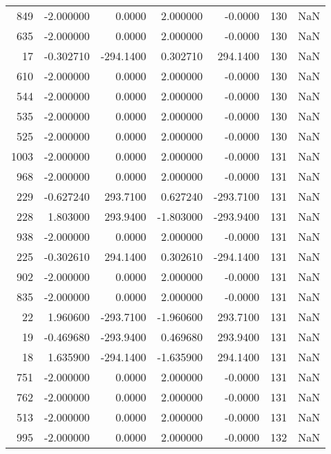\begin{tabular}{rrrrrrr}
 849 &   -2.000000 &    0.0000 &    2.000000 &     -0.0000 &         130 & NaN \\
 635 &   -2.000000 &    0.0000 &    2.000000 &     -0.0000 &         130 & NaN \\
  17 &   -0.302710 & -294.1400 &    0.302710 &    294.1400 &         130 & NaN \\
 610 &   -2.000000 &    0.0000 &    2.000000 &     -0.0000 &         130 & NaN \\
 544 &   -2.000000 &    0.0000 &    2.000000 &     -0.0000 &         130 & NaN \\
 535 &   -2.000000 &    0.0000 &    2.000000 &     -0.0000 &         130 & NaN \\
 525 &   -2.000000 &    0.0000 &    2.000000 &     -0.0000 &         130 & NaN \\
1003 &   -2.000000 &    0.0000 &    2.000000 &     -0.0000 &         131 & NaN \\
 968 &   -2.000000 &    0.0000 &    2.000000 &     -0.0000 &         131 & NaN \\
 229 &   -0.627240 &  293.7100 &    0.627240 &   -293.7100 &         131 & NaN \\
 228 &    1.803000 &  293.9400 &   -1.803000 &   -293.9400 &         131 & NaN \\
 938 &   -2.000000 &    0.0000 &    2.000000 &     -0.0000 &         131 & NaN \\
 225 &   -0.302610 &  294.1400 &    0.302610 &   -294.1400 &         131 & NaN \\
 902 &   -2.000000 &    0.0000 &    2.000000 &     -0.0000 &         131 & NaN \\
 835 &   -2.000000 &    0.0000 &    2.000000 &     -0.0000 &         131 & NaN \\
  22 &    1.960600 & -293.7100 &   -1.960600 &    293.7100 &         131 & NaN \\
  19 &   -0.469680 & -293.9400 &    0.469680 &    293.9400 &         131 & NaN \\
  18 &    1.635900 & -294.1400 &   -1.635900 &    294.1400 &         131 & NaN \\
 751 &   -2.000000 &    0.0000 &    2.000000 &     -0.0000 &         131 & NaN \\
 762 &   -2.000000 &    0.0000 &    2.000000 &     -0.0000 &         131 & NaN \\
 513 &   -2.000000 &    0.0000 &    2.000000 &     -0.0000 &         131 & NaN \\
 995 &   -2.000000 &    0.0000 &    2.000000 &     -0.0000 &         132 & NaN \\

\end{tabular}
